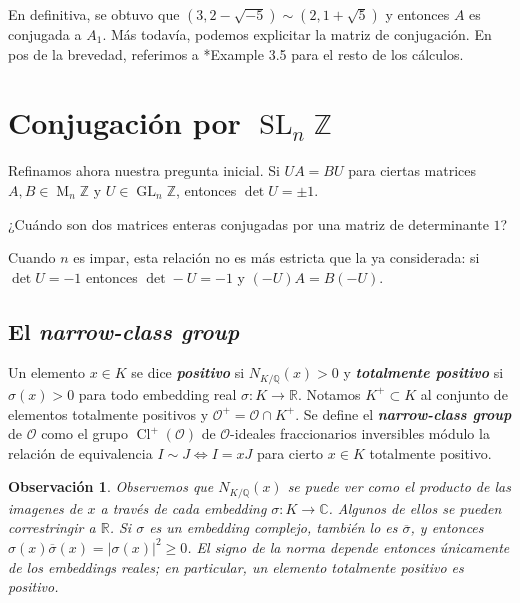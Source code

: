 \documentclass[11pt,a4paper]{amsart}
\newcommand{\C}{\mathbb{C}}
\newcommand{\R}{\mathbb{R}}
\newcommand{\Q}{\mathbb{Q}}
\newcommand{\Z}{\mathbb{Z}}
\renewcommand{\emph}[1]{\textbf{\textit{#1}}}
\DeclareMathOperator{\Cl}{Cl}
\DeclareMathOperator{\M}{M}
\DeclareMathOperator{\GL}{GL}
\DeclareMathOperator{\SL}{SL}
\numberwithin{equation}{section}
\theoremstyle{plain}
\newtheorem{obs}[equation]{Observación}
\renewcommand{\O}{\mathcal{O}}
\begin{document}
En definitiva, se obtuvo que $(3,2-\sqrt{-5}) \sim (2,1+\sqrt{5})$
y entonces $A$ es conjugada a $A_1$. Más todavía, podemos
explicitar la matriz de conjugación. En pos de la brevedad,
referimos a \cite{KCd}*{Example 3.5} para el resto de los cálculos.

\section{Conjugación por $\SL_n \Z$}

Refinamos ahora nuestra pregunta inicial. Si $UA = BU$
para ciertas matrices $A,B \in \M_n \Z$ y $U \in \GL_n \Z$,
entonces $\det U = \pm 1$.

¿Cuándo son dos matrices enteras
conjugadas por una matriz de determinante $1$?

Cuando $n$ es impar, esta relación no es más estricta que la ya
considerada: si $\det U = -1$ entonces $\det -U = -1$ y $(-U)A = B(-U)$.

\subsection{El \emph{narrow-class group}}

Un elemento $x \in K$ se dice \emph{positivo}
si $N_{K/\Q}(x) > 0$ y \emph{totalmente positivo}
si $\sigma(x) > 0$
para todo embedding real $\sigma \colon K \to \R$.
Notamos $K^+ \subset K$
al conjunto de elementos totalmente positivos y
$\O^+ = \O \cap K^+$.
Se define el \emph{narrow-class group} de $\O$ como
el grupo $\Cl^+(\O)$ de $\O$-ideales fraccionarios inversibles
módulo la relación de
equivalencia $I \sim J \iff I = xJ$ para cierto $x \in K$ totalmente
positivo.

\begin{obs} Observemos que $N_{K/\Q}(x)$ se puede ver como el
producto de las imagenes de $x$ a través de cada
\textit{embedding} $\sigma \colon K \to \C$. Algunos de ellos
se pueden correstringir a $\R$. Si $\sigma$ es un embedding complejo,
también lo es $\overline \sigma$, y entonces
$\sigma(x)\overline\sigma(x) = |\sigma(x)|^2 \ge 0$. El signo
de la norma depende entonces únicamente de los embeddings reales; en
particular, un elemento totalmente positivo es positivo.
\end{obs}
\end{document}
